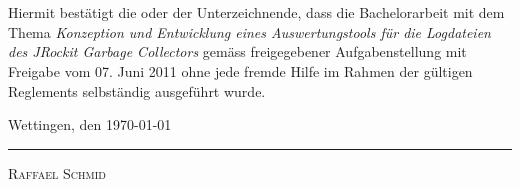 \newpage
\thispagestyle{empty}
\section*{}
\vspace{15mm}    %

Hiermit bestätigt die oder der Unterzeichnende, dass die Bachelorarbeit mit dem Thema \textit{Konzeption und Entwicklung eines Auswertungstools für die Logdateien des JRockit Garbage Collectors} gemäss freigegebener Aufgabenstellung mit Freigabe vom 07. Juni 2011 ohne jede fremde Hilfe im Rahmen der gültigen Reglements selbständig ausgeführt
wurde.
 
\vspace{20mm}
Wettingen, den \today
\vspace{20mm}


\rule[-0.2cm]{5cm}{0.5pt}


\textsc{Raffael Schmid} 